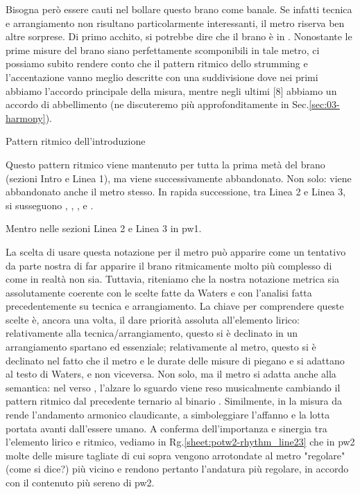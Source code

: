 \documentclass[class=book, crop=false, oneside, 12pt]{standalone}
\begin{document}
    Bisogna però essere cauti nel bollare questo brano come banale. Se infatti  tecnica e arrangiamento  non risultano particolarmente interessanti, il metro riserva ben altre sorprese. Di primo acchito, si potrebbe dire che il brano è in . Nonostante le prime misure del brano siano perfettamente scomponibili in tale metro, ci possiamo subito rendere conto che il pattern ritmico dello strumming e l'accentazione vanno meglio descritte con una suddivisione  dove nei primi  abbiamo l'accordo principale della misura, mentre negli ultimi [8] abbiamo un accordo di abbellimento (ne discuteremo più approfonditamente in Sec.\ref{sec:03-harmony}). 
    
    \begin{sheet}{Pattern ritmico dell'introduzione}
        \label{sheet:potw-rhythm_intro}
    \end{sheet}

    Questo pattern ritmico viene mantenuto per tutta la prima metà del brano (sezioni Intro e Linea 1), ma viene successivamente abbandonato. Non solo: viene abbandonato anche il metro stesso. In rapida successione, tra Linea 2 e Linea 3, si susseguono , , ,  e .

    \begin{sheet}{Mentro nelle sezioni Linea 2 e Linea 3 in \acrshort{pw1}.}
        \label{sheet:potw1-rhythm_line23}
    \end{sheet}
    
    La scelta di usare questa notazione per il metro può apparire come un tentativo da parte nostra di far apparire il brano ritmicamente molto più complesso di come in realtà non sia. Tuttavia, riteniamo che la nostra notazione metrica sia assolutamente coerente con le scelte fatte da Waters e con l'analisi fatta precedentemente su tecnica e arrangiamento. La chiave per comprendere queste scelte è, ancora una volta, il dare priorità assoluta all'elemento lirico: relativamente alla tecnica/arrangiamento, questo si è declinato in un arrangiamento spartano ed essenziale; relativamente al metro, questo si è declinato nel fatto che il metro e le durate delle misure di piegano e si adattano al testo di Waters, e non viceversa. Non solo, ma il metro si adatta anche alla semantica: nel verso , l'alzare lo sguardo viene reso musicalmente cambiando il pattern ritmico dal precedente ternario  al binario . Similmente, in  la misura da  rende l'andamento armonico claudicante, a simboleggiare l'affanno e la lotta portata avanti dall'essere umano. A conferma dell'importanza e sinergia tra l'elemento lirico e ritmico, vediamo in Rg.\ref{sheet:potw2-rhythm_line23} che in \acrshort{pw2} molte delle misure tagliate di cui sopra vengono arrotondate al metro "regolare" (come si dice?) più vicino e rendono pertanto l'andatura più regolare, in accordo con il contenuto più sereno di \acrshort{pw2}.
\end{document}
